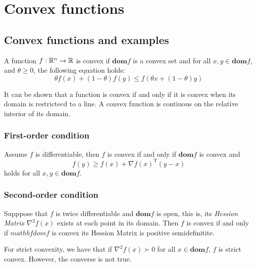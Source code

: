 \chapter{Convex functions}
\section{Convex functions and examples}
\begin{defn}
  A function $f:\mathbb{R}^n \to \mathbb{R}$ is convex if 
  $\mathbf{dom} f$ is a convex set and for all $x,y\in \mathbf{dom} 
  f$, and $\theta \geq 0$, the following equation holds:
  \begin{equation}
    \theta f(x)+(1-\theta ) f(y) \leq f(\theta x+(1-\theta) y)
  \end{equation}
\end{defn}
It can be shown that a function is convex if and only if it is 
convex when its domain is restrictecd to a line.
A convex function is contiuous on the relative interior of its 
domain.

\subsection{First-order condition}
\begin{thm}
  Assume $f$ is differentiable, then $f$ is convex if and only if
  $\mathbf{dom}f$ is convex and
  \begin{equation}
    f(y) \geq f(x)+\nabla f(x)^{\text{T}}(y-x)
  \end{equation}
  holds for all $x, y \in \mathbf{dom}f$.
\end{thm}

\subsection{Second-order condition}
\begin{thm}
  Supppose that $f$ is twice differentiable and $\mathbf{dom}f$ 
  is open, this is, its \emph{Hession Matrix} $\nabla^2f(x)$ exists 
  at each point in its domain. Then $f$ is convex if and only if 
  $mathbf{dom}f$ is convex its Hession Matrix is positive 
  semidefinitite. 
\end{thm}
For strict convexity, we have that if $\nabla^2 f(x) \succ 0$ for
all $x \in \mathbf{dom}f$, $f$ is strict convex. However, the
converse is not true.

